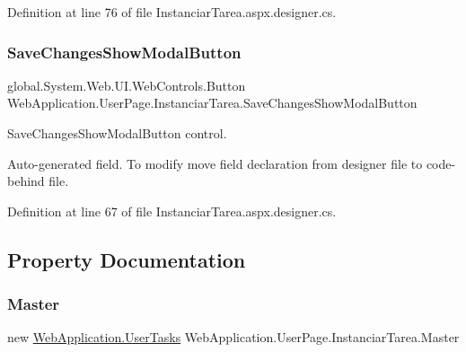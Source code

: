 Definition at line 76 of file Instanciar\+Tarea.\+aspx.\+designer.\+cs.

\mbox{\label{classWebApplication_1_1UserPage_1_1InstanciarTarea_ac543f83b3a3b6db54c3d5fa377fbb55e}} 
\subsubsection{\texorpdfstring{SaveChangesShowModalButton}{SaveChangesShowModalButton}}
{\footnotesize\ttfamily global.\+System.\+Web.\+U\+I.\+Web\+Controls.\+Button Web\+Application.\+User\+Page.\+Instanciar\+Tarea.\+Save\+Changes\+Show\+Modal\+Button\hspace{0.3cm}{\ttfamily [protected]}}



Save\+Changes\+Show\+Modal\+Button control. 

Auto-\/generated field. To modify move field declaration from designer file to code-\/behind file. 

Definition at line 67 of file Instanciar\+Tarea.\+aspx.\+designer.\+cs.



\subsection{Property Documentation}
\mbox{\label{classWebApplication_1_1UserPage_1_1InstanciarTarea_a5e1a64ee6224dcb58dbadb10c5958e69}} 
\subsubsection{\texorpdfstring{Master}{Master}}
{\footnotesize\ttfamily new \mbox{\hyperlink{classWebApplication_1_1UserTasks}{Web\+Application.\+User\+Tasks}} Web\+Application.\+User\+Page.\+Instanciar\+Tarea.\+Master\hspace{0.3cm}{\ttfamily [get]}}



